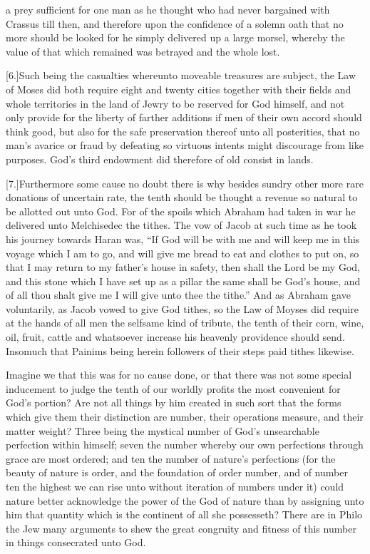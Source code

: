  a prey sufficient for one man as he thought who had never bargained with Crassus till then, and therefore upon the confidence of a solemn oath that no more should be looked for he simply delivered up a large morsel, whereby the value of that which remained was betrayed and the whole lost.

[6.]Such being the casualties whereunto moveable treasures are subject, the Law of Moses did both require eight and twenty cities together with their fields and whole territories in the land of Jewry to be reserved for God himself, and not only provide for the liberty of farther additions if men of their own accord should think good, but also for the safe preservation thereof unto all posterities, that no man’s avarice or fraud by defeating so virtuous intents might discourage from like purposes. God’s third endowment did therefore of old consist in lands.

[7.]Furthermore some cause no doubt there is why besides sundry other more rare donations of uncertain rate, the tenth should be thought a revenue so natural to be allotted out unto God. For of the spoils which Abraham had taken in war he delivered unto Melchisedec the tithes. The vow of Jacob at such time as he took his journey towards Haran was, “If God will be with me and will keep me in this voyage which I am to go, and will give me bread to eat and clothes to put on, so that I may return to my father’s house in safety, then shall the Lord be my God, and this stone which I have set up as a pillar the same shall be God’s house, and of all thou shalt give me I will give unto thee the tithe.” And as Abraham gave voluntarily, as Jacob vowed to give God tithes, so the Law of Moyses did require at the hands of all men the selfsame kind of tribute, the tenth of their corn, wine, oil, fruit, cattle and whatsoever increase his heavenly providence should send. Insomuch that Painims being herein followers of their steps paid tithes likewise.



Imagine we that this was for no cause done,
 or that there was not some special inducement to judge the tenth of our worldly profits the most convenient for God’s portion? Are not all things by him created in such sort that the forms which give them their distinction are number, their operations measure, and their matter weight? Three being the mystical number of God’s unsearchable perfection within himself; seven the number whereby our own perfections through grace are most ordered; and ten the number of nature’s perfections (for the beauty of nature is order, and the foundation of order number, and of number ten the highest we can rise unto without iteration of numbers under it) could nature better acknowledge the power of the God of nature than by assigning unto him that quantity which is the continent of all she possesseth? There are in Philo the Jew many arguments to shew the great congruity and fitness of this number in things consecrated unto God.

